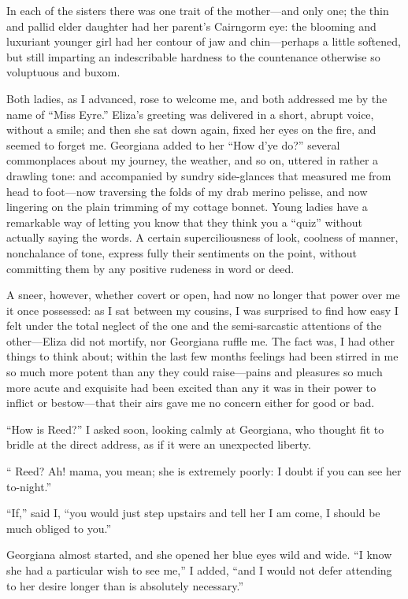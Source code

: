 In each of the sisters there was one trait of the mother---and only one;
the thin and pallid elder daughter had her parent's Cairngorm eye: the
blooming and luxuriant younger girl had her contour of jaw and
chin---perhaps a little softened, but still imparting an indescribable
hardness to the countenance otherwise so voluptuous and buxom.

Both ladies, as I advanced, rose to welcome me, and both addressed me by
the name of \enquote{Miss Eyre.} Eliza's greeting was delivered in a
short, abrupt voice, without a smile; and then she sat down again, fixed
her eyes on the fire, and seemed to forget me. Georgiana added to her
\enquote{How d'ye do?} several commonplaces about my journey, the
weather, and so on, uttered in rather a drawling tone: and accompanied
by sundry side-glances that measured me from head to foot---now
traversing the folds of my drab merino pelisse, and now lingering on the
plain trimming of my cottage bonnet. Young ladies have a remarkable way
of letting you know that they think you a \enquote{quiz} without
actually saying the words. A certain superciliousness of look, coolness
of manner, nonchalance of tone, express fully their sentiments on the
point, without committing them by any positive rudeness in word or deed.

A sneer, however, whether covert or open, had now no longer that power
over me it once possessed: as I sat between my cousins, I was surprised
to find how easy I felt under the total neglect of the one and the
semi-sarcastic attentions of the other---Eliza did not mortify, nor
Georgiana ruffle me. The fact was, I had other things to think about;
within the last few months feelings had been stirred in me so much more
potent than any they could raise---pains and pleasures so much more
acute and exquisite had been excited than any it was in their power to
inflict or bestow---that their airs gave me no concern either for good
or bad.

\enquote{How is \Mrs{} Reed?} I asked soon, looking calmly at Georgiana,
who thought fit to bridle at the direct address, as if it were an
unexpected liberty.

\enquote{\Mrs{} Reed? Ah! mama, you mean; she is extremely poorly: I
	doubt if you can see her to-night.}

\enquote{If,} said I, \enquote{you would just step upstairs and tell her
	I am come, I should be much obliged to you.}

Georgiana almost started, and she opened her blue eyes wild and wide.
\enquote{I know she had a particular wish to see me,} I added,
\enquote{and I would not defer attending to her desire longer than is
	absolutely necessary.}


